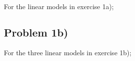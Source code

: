 \documentclass[a4paper,11pt]{article}
\begin{document}
For the linear models in exercise 1a);
{\footnotesize
    
}

\subsection{Problem 1b)}
\label{app:b}

For the three linear models in exercise 1b);
{\footnotesize
    
}



%
\end{document}
